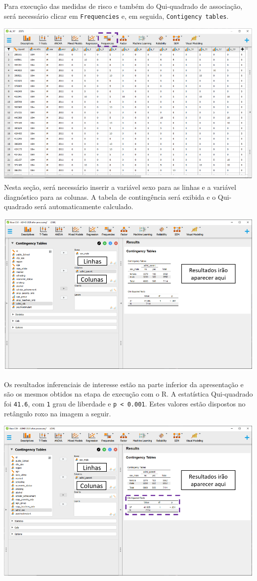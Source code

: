 \documentclass[
]{book}
\begin{document}
Para execução das medidas de risco e também do Qui-quadrado de associação, será necessário clicar em \texttt{Frequencies} e, em seguida, \texttt{Contigency\ tables}.

\includegraphics{./img/cap_x2_interface.png}
Nesta seção, será necessário inserir a variável sexo para as linhas e a variável diagnóstico para as colunas. A tabela de contingência será exibida e o Qui-quadrado será automaticamente calculado.

\includegraphics{./img/cap_x2_resultados.png}

Os resultados inferenciais de interesse estão na parte inferior da apresentação e são os mesmos obtidos na etapa de execução com o R. A estatística Qui-quadrado foi \texttt{41.6}, com \texttt{1} grau de liberdade e \texttt{p\ \textless{}\ 0.001}. Estes valores estão dispostos no retângulo roxo na imagem a seguir.

\includegraphics{./img/cap_x2_resultados2.png}
\end{document}
